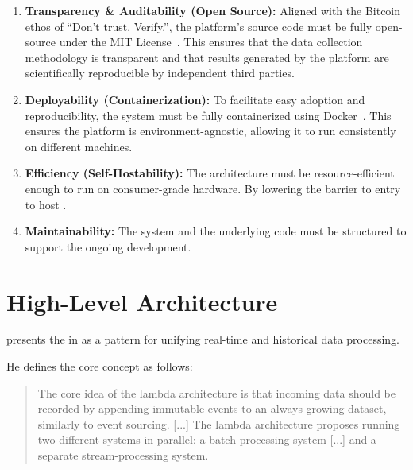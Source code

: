 \begin{enumerate}[label=\textbf{RN\arabic*}, ref=RN\arabic*, leftmargin=3.5em]
    \item \label{req:open-source} \textbf{Transparency \& Auditability (Open Source):} 
    Aligned with the Bitcoin ethos of \enquote{Don't trust. Verify.}, 
    the platform's source code must be fully open-source under the MIT License~\cite{opensourceinitiative_mit_1988}. 
    This ensures that the data collection methodology is transparent and 
    that results generated by the platform are scientifically reproducible by independent third parties.
    
    \item \label{req:docker} \textbf{Deployability (Containerization):} 
    To facilitate easy adoption and reproducibility, the system must be fully containerized using Docker~\cite{merkel_docker_2014}. 
    This ensures the platform is environment-agnostic, allowing it to run consistently on different machines.
    
    \item \label{req:self-host} \textbf{Efficiency (Self-Hostability):} 
    The architecture must be resource-efficient enough to run on consumer-grade hardware. 
    By lowering the barrier to entry to host .

    \item \label{req:maintainability} \textbf{Maintainability:}
    The system and the underlying code must be structured to support the ongoing development. 
\end{enumerate}



\section{High-Level Architecture}
\label{sec:high-level-architecture}

\citeauthor{kleppmann_designing_2017} presents the  in 
as a pattern for unifying real-time and historical data processing. 

He defines the core concept as follows:
\begin{quote}
The core idea of the lambda architecture is that incoming data should be recorded by appending immutable events to an always-growing dataset,
similarly to event sourcing. [...] The lambda architecture proposes running two different systems in parallel: 
a batch processing system [...] and a separate stream-processing system.~\cite[p.~519]{kleppmann_designing_2017}   
\end{quote}

